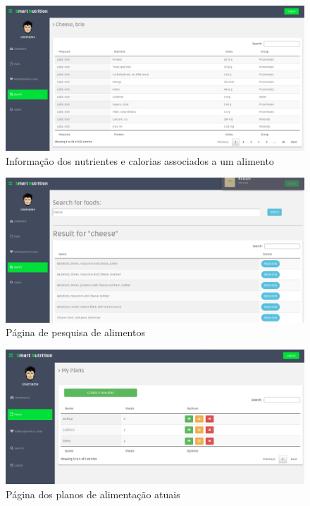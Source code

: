 \documentclass[twocolumn,twoside,11pt,a4paper]{article}
\begin{document}
\begin{figure}
\includegraphics[scale=0.38]{food}
\caption{Informação dos nutrientes e calorias associados a um alimento}
\label{fig:food}
\end{figure}

\begin{figure}
\includegraphics[scale=0.38]{search}
\caption{Página de pesquisa de alimentos}
\label{fig:search}
\end{figure}

\begin{figure}
\includegraphics[scale=0.38]{plans}
\caption{Página dos planos de alimentação atuais}
\label{fig:plans}
\end{figure}
\end{document}
